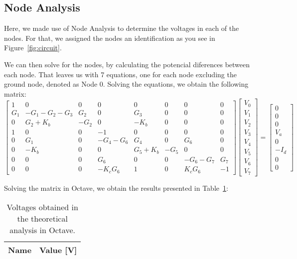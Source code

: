 \subsection{Node Analysis}
\label{subsec:node}
\tab Here, we made use of Node Analysis to determine the voltages in each
of the nodes. For that, we assigned the nodes an identification as you see
in Figure~\ref{fig:circuit}.\par
We can then solve for the nodes, by calculating the potencial diferences between each node. That leaves us with 7 equations, one for each node excluding the ground node, denoted as Node 0.
Solving the equations, we obtain the following matrix:
\begin{equation}
\begin{bmatrix}
  1 & 0 & 0 & 0 & 0 & 0 & 0 & 0 \\
  G_1 & -G_1-G_2-G_3 & G_2 & 0 & G_3 & 0 & 0 & 0 \\
  0 & G_2+K_b & -G_2 & 0 & -K_b & 0 & 0 & 0 \\
  1 & 0 & 0 & -1 & 0 & 0 & 0 & 0 \\
  0 & G_1 & 0 &-G_4-G_6 & G_4 & 0 & G_6 & 0 \\
  0 & -K_b & 0 & 0 & G_5+K_b & -G_5 & 0 & 0 \\
  0 & 0 & 0 & G_6 & 0 & 0 & -G_6-G_7 & G_7 \\
  0 & 0 & 0 & -K_c G_6 & 1 & 0 & K_c G_6 & -1
\end{bmatrix}
\begin{bmatrix}
  V_0 \\ V_1 \\ V_2 \\ V_3 \\ V_4 \\ V_5 \\ V_6 \\ V_7
\end{bmatrix}
=
\begin{bmatrix}
  0 \\ 0 \\ 0 \\ V_a \\ 0 \\ -I_d \\ 0 \\ 0
\end{bmatrix}
\end{equation}\par
Solving the matrix in Octave, we obtain the results presented in Table~\ref{tab:octave_voltages}:
\begin{table}[h]
  \centering
  \begin{tabular}{|l|r|}
    \hline    
    {\bf Name} & {\bf Value [V]} \\ \hline
	
  \end{tabular}
  \caption{Voltages obtained in the theoretical analysis in Octave.}
  \label{tab:octave_voltages}
\end{table}
